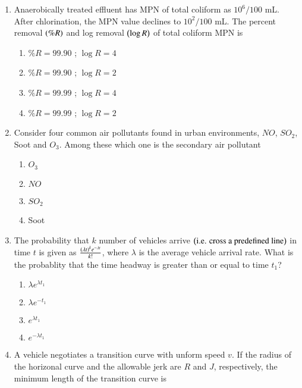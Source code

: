 \documentclass[journal,onecolumn]{IEEEtran}
\theoremstyle{remark}
\begin{document}
\begin{enumerate}
    \item Anaerobically treated effluent has MPN of total coliform as $10^6/100$ mL. After chlorination, the MPN value declines to $10^2/100$ mL. The percent removal $\left(\%R\right)$ and log removal $\left(\log R\right)$ of total coliform MPN is
	\hfill{}

	\begin{enumerate}
		\item $\%R = 99.90$ ; $\log R = 4$
		\item $\%R = 99.90$ ; $\log R = 2$
		\item $\%R = 99.99$ ; $\log R = 4$
		\item $\%R = 99.99$ ; $\log R = 2$
	\end{enumerate}


    \item Consider four common air pollutants found in urban environments, $NO$, $SO_2$, Soot and $O_3$. Among these which one is the secondary air pollutant
	\hfill{}
	
	\begin{enumerate}
		\item $O_3$
		\item $NO$
		\item $SO_2$
		\item Soot
	\end{enumerate}


    \item The probability that $k$ number of vehicles arrive $\left(\text{i.e. cross a predefined line}\right)$ in time $t$ is given as $\frac{\left(\lambda t\right)^k e^{-\lambda t}}{k!}$, where $\lambda$ is the average vehicle arrival rate. What is the probablity that the time headway is greater than or equal to time $t_1$?
	\hfill{}

	\begin{enumerate}
		\item $\lambda e^{\lambda t_1}$
		\item $\lambda e^{-t_1}$
		\item $e^{\lambda t_1}$
		\item $e^{-\lambda t_1}$
	\end{enumerate}


    \item A vehicle negotiates a transition curve with unform speed $v$. If the radius of the horizonal curve and the allowable jerk are $R$ and $J$, respectively, the minimum length of the transition curve is
	\hfill{}


\end{enumerate}
\end{document}
